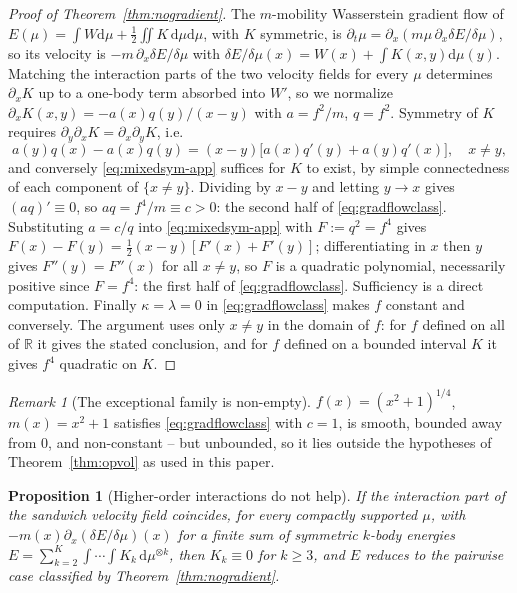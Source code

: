 \documentclass[11pt]{article}
\newcommand{\R}{\mathbb{R}}
\newcommand{\dd}{\mathrm{d}}
\theoremstyle{plain}
\newtheorem{proposition}[theorem]{Proposition}
\theoremstyle{definition}
\theoremstyle{remark}
\newtheorem{remark}[theorem]{Remark}
\begin{document}
\begin{proof}[Proof of Theorem~\ref{thm:nogradient}]
The $m$-mobility Wasserstein gradient flow of $E(\mu)=\int W\dd\mu+\tfrac12\iint K\,\dd\mu\dd\mu$, with $K$ symmetric, is
$\partial_t\mu=\partial_x(m\mu\,\partial_x\delta E/\delta\mu)$, so its velocity is $-m\,\partial_x\delta E/\delta\mu$ with
$\delta E/\delta\mu(x)=W(x)+\int K(x,y)\dd\mu(y)$. Matching the interaction parts of
the two velocity fields for every $\mu$ determines $\partial_xK$ up to a one-body term
absorbed into $W'$, so we normalize $\partial_xK(x,y)=-a(x)q(y)/(x-y)$ with $a=f^2/m$,
$q=f^2$. Symmetry of $K$ requires $\partial_y\partial_xK=\partial_x\partial_yK$, i.e.
\begin{equation}\label{eq:mixedsym-app}
  a(y)q(x)-a(x)q(y) = (x-y)\big[a(x)q'(y)+a(y)q'(x)\big],\quad x\ne y,
\end{equation}
and conversely \eqref{eq:mixedsym-app} suffices for $K$ to exist, by simple
connectedness of each component of $\{x\ne y\}$. Dividing by $x-y$ and letting
$y\to x$ gives $(aq)'\equiv0$, so $aq=f^4/m\equiv c>0$: the second half of
\eqref{eq:gradflowclass}. Substituting $a=c/q$ into \eqref{eq:mixedsym-app} with
$F:=q^2=f^4$ gives $F(x)-F(y)=\tfrac12(x-y)[F'(x)+F'(y)]$; differentiating in $x$ then
$y$ gives $F''(y)=F''(x)$ for all $x\ne y$, so $F$ is a quadratic polynomial,
necessarily positive since $F=f^4$: the first half of \eqref{eq:gradflowclass}.
Sufficiency is a direct computation. Finally $\kappa=\lambda=0$ in
\eqref{eq:gradflowclass} makes $f$ constant and conversely. The argument uses only $x\neq y$ in the domain of $f$: for $f$ defined on all of $\R$ it gives the
stated conclusion, and for $f$ defined on a bounded interval $K$ it gives $f^4$ quadratic on $K$.
\end{proof}

\begin{remark}[The exceptional family is non-empty]
$f(x)=(x^2+1)^{1/4}$, $m(x)=x^2+1$ satisfies \eqref{eq:gradflowclass} with $c=1$,
is smooth, bounded away from $0$, and non-constant -- but unbounded, so it lies
outside the hypotheses of Theorem~\ref{thm:opvol} as used in this paper.
\end{remark}

\begin{proposition}[Higher-order interactions do not help]\label{prop:higherorder}
If the interaction part of the sandwich velocity field coincides, for every
compactly supported $\mu$, with $-m(x)\partial_x(\delta E/\delta\mu)(x)$ for a finite
sum of symmetric $k$-body energies $E=\sum_{k=2}^K\int\!\cdots\!\int K_k\,\dd\mu^{
\otimes k}$, then $K_k\equiv0$ for $k\ge3$, and $E$ reduces to the pairwise case
classified by Theorem~\ref{thm:nogradient}.
\end{proposition}
\end{document}
